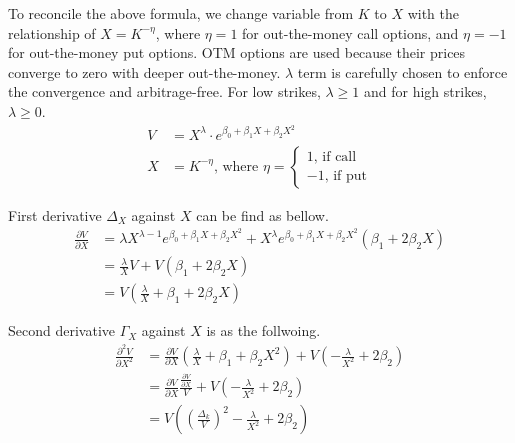 \documentclass{article}
\begin{document}
To reconcile the above formula, we change variable from $ K $ to $ X $ with the relationship of $ X = K^{-\eta} $, where $ \eta = 1 $ for out-the-money call options, and $ \eta = -1 $ for out-the-money put options.
OTM options are used because their prices converge to zero with deeper out-the-money.
$ \lambda $ term is carefully chosen to enforce the convergence and arbitrage-free.
For low strikes, $ \lambda \geq 1 $ and for high strikes, $ \lambda \geq 0 $.
\begin{subequations}
    \begin{align}   
        V &= X^{\lambda} \cdot e^{\beta_0 + \beta_1 X + \beta_2 X^2} \\
        X &= K^{-\eta} \text{, where } \eta = 
        \begin{cases}
            1 \text{, if call} \\
            -1 \text{, if put}
        \end{cases}
    \end{align}
\end{subequations}

First derivative $ \Delta_X $ against $ X $ can be find as bellow.
\begin{align}
    \frac{\partial V}{\partial X} &= \lambda X^{\lambda - 1} e^{\beta_0 + \beta_1 X + \beta_2 X^2} + X^{\lambda} e^{\beta_0 + \beta_1 X + \beta_2 X^2} \left(\beta_1 + 2 \beta_2 X \right) \nonumber \\
    &= \frac{\lambda}{X} V + V \left(\beta_1 + 2 \beta_2 X\right) \nonumber \\
    &= V \left(\frac{\lambda}{X} + \beta_1 + 2 \beta_2 X\right)
\end{align}

Second derivative $ \Gamma_X $ against $ X $ is as the follwoing.
\begin{align}
    \frac{\partial^2 V}{\partial X^2} &= \frac{\partial V}{\partial X} \left(\frac{\lambda}{X} + \beta_1 + \beta_2 X^2\right) + V \left(-\frac{\lambda}{X^2} + 2 \beta_2\right) \nonumber \\
    &= \frac{\partial V}{\partial X} \frac{\frac{\partial V}{\partial X}}{V} + V \left(-\frac{\lambda}{X^2} + 2 \beta_2\right) \nonumber \\
    &= V \left(\left(\frac{\Delta_k}{V}\right)^2 -\frac{\lambda}{X^2} + 2 \beta_2 \right)
\end{align}
\end{document}

